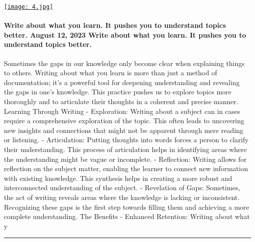 \documentclass[10pt,a4paper]{article}
\begin{document}
\begin{minipage}[t]{0.80\linewidth}
\vspace{0pt}
\begin{multicols}{2}

    \href{https://addyosmani.com/blog/write-learn/?utm\_source=hackernewsletter\&utm\_medium=email\&utm\_term=fav}{
        \texttt{[image: 4.jpg]}
    }
  
\paragraph{Write about what you learn. It pushes you to understand topics better.
August 12, 2023
Write about what you learn. It pushes you to understand topics better.}
 Sometimes the gaps in our knowledge only become clear when explaining things to others.
Writing about what you learn is more than just a method of documentation; it's a powerful tool for deepening understanding and revealing the gaps in one's knowledge. This practice pushes us to explore topics more thoroughly and to articulate their thoughts in a coherent and precise manner.
Learning Through Writing
- Exploration: Writing about a subject can in cases require a comprehensive exploration of the topic. This often leads to uncovering new insights and connections that might not be apparent through mere reading or listening.
- Articulation: Putting thoughts into words forces a person to clarify their understanding. This process of articulation helps in identifying areas where the understanding might be vague or incomplete.
- Reflection: Writing allows for reflection on the subject matter, enabling the learner to connect new information with existing knowledge. This synthesis helps in creating a more robust and interconnected understanding of the subject.
- Revelation of Gaps: Sometimes, the act of writing reveals areas where the knowledge is lacking or inconsistent. Recognizing these gaps is the first step towards filling them and achieving a more complete understanding.
The Benefits
- Enhanced Retention: Writing about what y

\end{multicols}
\end{minipage}
\par\medskip
\noindent\textcolor{red}{\rule{\linewidth}{0.2mm}}
\end{document}
